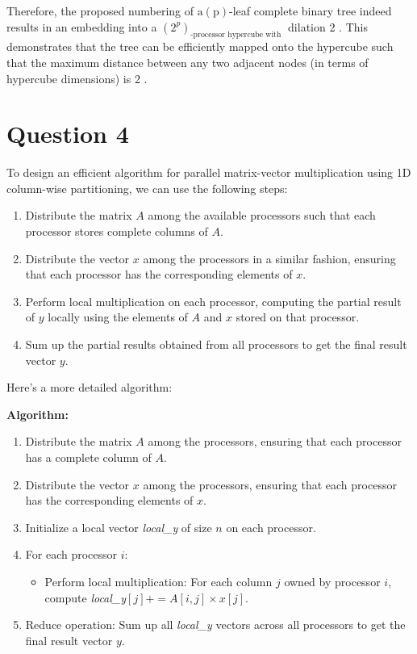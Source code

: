 \documentclass{article}
\begin{document}
Therefore, the proposed numbering of $\mathrm{a}(\mathrm{p})$-leaf complete binary tree indeed results in an embedding into a $\left(2^p\right)_{\text {-processor hypercube with }}$ dilation 2 . This demonstrates that the tree can be efficiently mapped onto the hypercube such that the maximum distance between any two adjacent nodes (in terms of hypercube dimensions) is 2 .
\section{Question 4}
To design an efficient algorithm for parallel matrix-vector multiplication using 1D column-wise partitioning, we can use the following steps:
\begin{enumerate}
    \item Distribute the matrix $A$ among the available processors such that each processor stores complete columns of $A$.
    \item Distribute the vector $x$ among the processors in a similar fashion, ensuring that each processor has the corresponding elements of $x$.
    \item Perform local multiplication on each processor, computing the partial result of $y$ locally using the elements of $A$ and $x$ stored on that processor.
    \item Sum up the partial results obtained from all processors to get the final result vector $y$.
\end{enumerate}

Here's a more detailed algorithm:

\textbf{Algorithm:}
\begin{enumerate}
    \item Distribute the matrix $A$ among the processors, ensuring that each processor has a complete column of $A$.
    \item Distribute the vector $x$ among the processors, ensuring that each processor has the corresponding elements of $x$.
    \item Initialize a local vector \textit{local\_y} of size $n$ on each processor.
    \item For each processor $i$:
    \begin{itemize}
        \item Perform local multiplication: For each column $j$ owned by processor $i$, compute \textit{local\_y}$[j] += A[i, j] \times x[j]$.
    \end{itemize}
    \item Reduce operation: Sum up all \textit{local\_y} vectors across all processors to get the final result vector $y$.
\end{enumerate}
\end{document}
